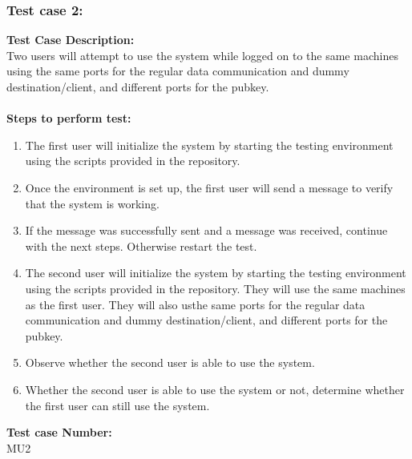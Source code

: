 \documentclass{article}
\begin{document}
\subsubsection{Test case 2: }
\textbf{Test Case Description:\\} Two users will attempt to use the system while logged on to the same machines using the same ports for the regular data communication and dummy destination/client, and different ports for the pubkey.\\\\
\textbf{Steps to perform test: } 
\begin{enumerate}
    \item The first user will initialize the system by starting the testing environment using the scripts provided in the repository.
    \item Once the environment is set up, the first user will send a message to verify that the system is working.
    \item If the message was successfully sent and a message was received, continue with the next steps. Otherwise restart the test.
    \item The second user will initialize the system by starting the testing environment using the scripts provided in the repository. They will use the same machines as the first user. They will also usthe same ports for the regular data communication and dummy destination/client, and different ports for the pubkey.
    \item Observe whether the second user is able to use the system.
    \item Whether the second user is able to use the system or not, determine whether the first user can still use the system.
\end{enumerate}
\textbf{Test case Number: \\} MU2
\end{document}
